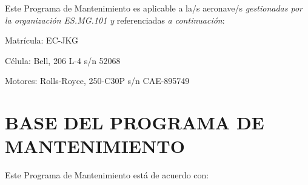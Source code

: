 \documentclass[
]{article}
\begin{document}
Este Programa de Mantenimiento es aplicable a la/s aeronave/s
\emph{gestionadas por la organización ES.MG.101 y} referenciadas \emph{a
continuación}:

Matrícula: EC-JKG

Célula: Bell, 206 L-4 s/n 52068

Motores: Rolls-Royce, 250-C30P s/n CAE-895749

\newpage

\hypertarget{base-del-programa-de-mantenimiento}{%
\section{BASE DEL PROGRAMA DE
MANTENIMIENTO}\label{base-del-programa-de-mantenimiento}}

Este Programa de Mantenimiento está de acuerdo con:
\end{document}
